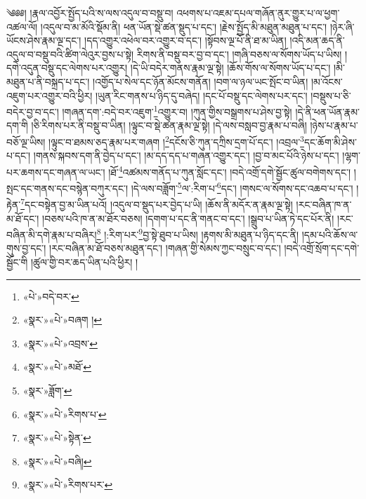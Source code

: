 ༄༅༅། །རྣལ་འབྱོར་སྤྱོད་པའི་ས་ལས་འདུལ་བ་བསྡུ་བ། འཕགས་པ་འཇམ་དཔལ་གཞོན་ནུར་གྱུར་པ་ལ་ཕྱག་འཚལ་ལོ། །འདུལ་བ་མ་མོའི་སྡོམ་ནི། ཕན་ཡོན་སྡེ་ཚན་སྡུད་པ་དང་། །རྗེས་སྤྱོད་མི་མཐུན་མཐུན་པ་དང་། །ཉེར་ཞི་ཡོངས་ཤེས་རྣམ་ལྔ་དང་། །དད་འགྱུར་འཕེལ་བར་འགྱུར་བ་དང་། །སྟོབས་ལྔ་པོ་ནི་ཐ་མ་ཡིན། །འདི་མན་ཆད་ནི་འདུལ་བ་བསྡུ་བའི་ཚིག་ལེའུར་བྱས་པ་སྟེ། རིགས་ནི་བསྡུ་བར་བྱ་བ་དང་། །གཞི་བཅས་ལ་སོགས་ཡོད་པ་ཡིས། །དགེ་འདུན་བསྡུ་དང་ལེགས་པར་འགྱུར། །དེ་ཡི་བདེར་གནས་རྣམ་ལྔ་སྟེ། །ཆོས་གོས་ལ་སོགས་ཡོད་པ་དང་། །མི་མཐུན་པ་ནི་བསྐྲད་པ་དང་། །འགྱོད་པ་སེལ་དང་ཉོན་མོངས་གནོན། །བག་ལ་ཉལ་ཡང་སྤོང་བ་ཡིན། །མ་འོངས་འཇུག་པར་འགྱུར་བའི་ཕྱིར། །ཡུན་རིང་གནས་པ་ཉིད་དུ་བཞེད། །དང་པོ་བསྡུ་དང་ལེགས་པར་དང་། །བསྡུས་པ་ཅི་བདེར་བྱ་བ་དང་། །གཞན་དག་:བདེ་བར་འཇུག་\footnote{«པེ་»བདེ་བར་}འགྱུར་བ། །ཀུན་གྱིས་བསྒྲགས་པ་ཤེས་བྱ་སྟེ། །དེ་ནི་ཕན་ཡོན་རྣམ་དག་གི །ཅི་རིགས་པར་ནི་བསྡུ་བ་ཡིན། །ལྟུང་བ་སྡེ་ཚན་རྣམ་ལྔ་སྟེ། །དེ་ལས་བསླབ་བྱ་རྣམ་པ་བཞི། །ཉེས་པ་རྣམ་པ་བཅོ་ལྔ་ཡིས། །ལྟུང་བ་ཐམས་ཅད་རྣམ་པར་གཞག །\footnote{«སྣར་»«པེ་»བཞག །}དངོས་ཅི་ཀུན་དཀྲིས་དྲག་པོ་དང་། །འབྲལ་\footnote{«སྣར་»«པེ་»འབྲས་}དང་ཆོག་མི་ཤེས་པ་དང་། །གནས་སྐབས་དག་ནི་བྱེད་པ་དང་། །མ་དད་དད་པ་གཞན་འགྱུར་དང་། །བྱ་བ་མང་པོའི་ཉེས་པ་དང་། །ལྷག་པར་ཆགས་དང་གཞན་ལ་ཡང་། །ཐོ་\footnote{«སྣར་»«པེ་»མཐོ་}འཚམས་གནོད་པ་ཀུན་སློང་དང་། །བདེ་འགྲོ་དགེ་སྦྱོང་ཚུལ་བགེགས་དང་། །སྤང་དང་གནས་དང་བསྙེན་བཀུར་དང་། །དེ་ལས་བཟློག་\footnote{«སྣར་»ཟློག་}ལ་:རིག་པ་\footnote{«སྣར་»«པེ་»རིགས་པ་}དང་། །གསང་ལ་སོགས་དང་འཆབ་པ་དང་། །རྟེན་\footnote{«སྣར་»«པེ་»སྟེན་}དང་བསྟེན་བྱ་མ་ཡིན་པའོ། །འདུལ་བ་སྡུད་པར་བྱེད་པ་ཡི། །ཆོས་ནི་མདོར་ན་རྣམ་ལྔ་སྟེ། །རང་བཞིན་ཁ་ན་མ་ཐོ་དང་། །བཅས་པའི་ཁ་ན་མ་ཐོར་བཅས། །དགག་པ་དང་ནི་གནང་བ་དང་། །སྒྲུབ་པ་ཡིན་ཏེ་དང་པོར་ནི། །རང་བཞིན་མི་དགེ་རྣམ་པ་བཞིར།\footnote{«སྣར་»«པེ་»བཞི།} །:རིག་པར་\footnote{«སྣར་»«པེ་»རིགས་པར་}བྱ་སྟེ་ཐུབ་པ་ཡིས། །རྟགས་མི་མཐུན་པ་ཉིད་དང་ནི། །དམ་པའི་ཆོས་ལ་གུས་བྱ་དང་། །རང་བཞིན་མ་ཐོ་བཅས་མཐུན་དང་། །གཞན་གྱི་སེམས་ཀྱང་བསྲུང་བ་དང་། །བདེ་འགྲོ་སྲོག་དང་དགེ་སྦྱོང་གི །ཚུལ་གྱི་བར་ཆད་ཡིན་པའི་ཕྱིར། །
